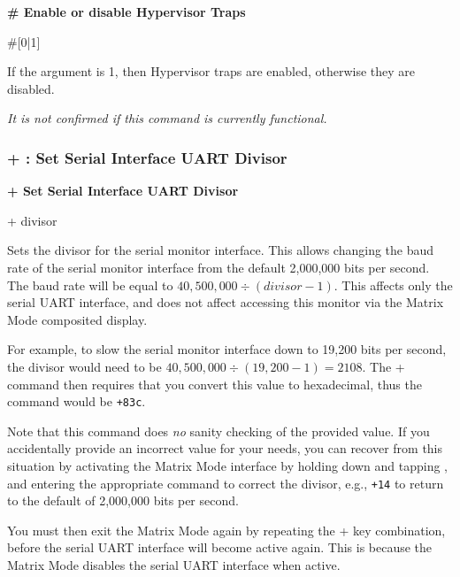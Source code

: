 \begin{description}[leftmargin=2cm,style=nextline]
\item [Format:] {\bf \# Enable or disable Hypervisor Traps}
\item [Usage:] \#[0|1]

\item [Remarks:] If the argument is 1, then Hypervisor traps are enabled,
  otherwise they are disabled.

  {\em It is not confirmed if this command is currently functional.}
\end{description}


\subsubsection{+ : Set Serial Interface UART Divisor}

\begin{description}[leftmargin=2cm,style=nextline]
\item [Format:] {\bf + Set Serial Interface UART Divisor}
\item [Usage:] + divisor

\item [Remarks:] Sets the divisor for the serial monitor interface.
  This allows changing the baud rate of the serial monitor interface
  from the default 2,000,000 bits per second.  The baud rate will be
  equal to $40,500,000 \div (divisor-1)$. This affects only the
  serial UART interface, and does not affect accessing this monitor
  via the Matrix Mode composited display.

  For example, to slow the
  serial monitor interface down to 19,200 bits per second, the divisor
  would need to be $40,500,000 \div (19,200 - 1) = 2108$.
  The + command then requires that you convert this value to hexadecimal,
  thus the command would be {\tt +83c}.  

  Note that this command does {\em no} sanity checking of the provided value.
  If you accidentally provide an incorrect value for your needs, you can
  recover from this situation by activating the Matrix Mode interface by holding
  down \megasymbolkey and tapping , and entering
  the appropriate command to correct the divisor, e.g., {\tt +14} to return
  to the default of 2,000,000 bits per second.

  You must then exit the Matrix
  Mode again by repeating the \megasymbolkey +  key combination,
  before the serial UART interface will become active again. This is because
  the Matrix Mode disables the serial UART interface when active.
\end{description}

